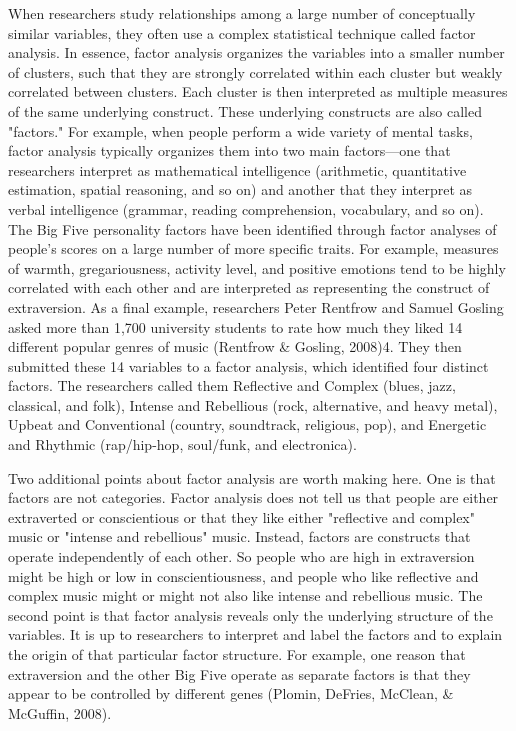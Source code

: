 When researchers study relationships among a large number of conceptually similar variables, they often use a complex statistical technique called factor analysis. In essence, factor analysis organizes the variables into a smaller number of clusters, such that they are strongly correlated within each cluster but weakly correlated between clusters. Each cluster is then interpreted as multiple measures of the same underlying construct. These underlying constructs are also called "factors." For example, when people perform a wide variety of mental tasks, factor analysis typically organizes them into two main factors---one that researchers interpret as mathematical intelligence (arithmetic, quantitative estimation, spatial reasoning, and so on) and another that they interpret as verbal intelligence (grammar, reading comprehension, vocabulary, and so on). The Big Five personality factors have been identified through factor analyses of people's scores on a large number of more specific traits. For example, measures of warmth, gregariousness, activity level, and positive emotions tend to be highly correlated with each other and are interpreted as representing the construct of extraversion. As a final example, researchers Peter Rentfrow and Samuel Gosling asked more than 1,700 university students to rate how much they liked 14 different popular genres of music (Rentfrow \& Gosling, 2008)4. They then submitted these 14 variables to a factor analysis,
which identified four distinct factors. The researchers called them Reflective and Complex (blues, jazz, classical, and folk), Intense and Rebellious (rock, alternative, and heavy metal), Upbeat and Conventional (country, soundtrack, religious, pop), and Energetic and Rhythmic (rap/hip-hop, soul/funk, and electronica).

Two additional points about factor analysis are worth making here. One is that factors are not categories. Factor analysis does not tell us that people are either extraverted or conscientious or that they like either "reflective and complex" music or "intense and rebellious" music. Instead, factors are constructs that operate independently of each other. So people who are high in extraversion might be high or low in conscientiousness, and people who like reflective and complex music might or might not also like intense and rebellious music. The second point is that factor analysis reveals only the underlying structure of the variables. It is up to researchers to interpret and label the factors and to explain the origin of that particular factor structure. For example, one reason that extraversion and the other Big Five operate as separate factors is that they appear to be controlled by different genes (Plomin, DeFries, McClean, \& McGuffin, 2008).

